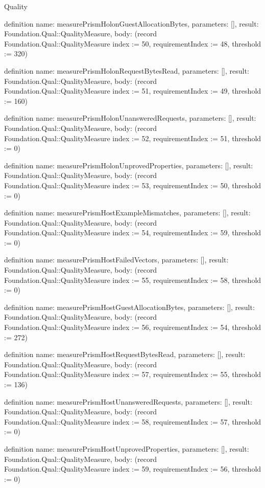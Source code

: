 \begin{lexlean}{Quality}
\begin{semanticmodule}
definition{
  name: measurePrismHolonGuestAllocationBytes,
  parameters: [],
  result: Foundation.Qual::QualityMeasure,
  body: (record Foundation.Qual::QualityMeasure {index := 50, requirementIndex := 48, threshold := 320})
}

definition{
  name: measurePrismHolonRequestBytesRead,
  parameters: [],
  result: Foundation.Qual::QualityMeasure,
  body: (record Foundation.Qual::QualityMeasure {index := 51, requirementIndex := 49, threshold := 160})
}

definition{
  name: measurePrismHolonUnansweredRequests,
  parameters: [],
  result: Foundation.Qual::QualityMeasure,
  body: (record Foundation.Qual::QualityMeasure {index := 52, requirementIndex := 51, threshold := 0})
}

definition{
  name: measurePrismHolonUnprovedProperties,
  parameters: [],
  result: Foundation.Qual::QualityMeasure,
  body: (record Foundation.Qual::QualityMeasure {index := 53, requirementIndex := 50, threshold := 0})
}

definition{
  name: measurePrismHostExampleMismatches,
  parameters: [],
  result: Foundation.Qual::QualityMeasure,
  body: (record Foundation.Qual::QualityMeasure {index := 54, requirementIndex := 59, threshold := 0})
}

definition{
  name: measurePrismHostFailedVectors,
  parameters: [],
  result: Foundation.Qual::QualityMeasure,
  body: (record Foundation.Qual::QualityMeasure {index := 55, requirementIndex := 58, threshold := 0})
}

definition{
  name: measurePrismHostGuestAllocationBytes,
  parameters: [],
  result: Foundation.Qual::QualityMeasure,
  body: (record Foundation.Qual::QualityMeasure {index := 56, requirementIndex := 54, threshold := 272})
}

definition{
  name: measurePrismHostRequestBytesRead,
  parameters: [],
  result: Foundation.Qual::QualityMeasure,
  body: (record Foundation.Qual::QualityMeasure {index := 57, requirementIndex := 55, threshold := 136})
}

definition{
  name: measurePrismHostUnansweredRequests,
  parameters: [],
  result: Foundation.Qual::QualityMeasure,
  body: (record Foundation.Qual::QualityMeasure {index := 58, requirementIndex := 57, threshold := 0})
}

definition{
  name: measurePrismHostUnprovedProperties,
  parameters: [],
  result: Foundation.Qual::QualityMeasure,
  body: (record Foundation.Qual::QualityMeasure {index := 59, requirementIndex := 56, threshold := 0})
}


\end{semanticmodule}
\end{lexlean}
